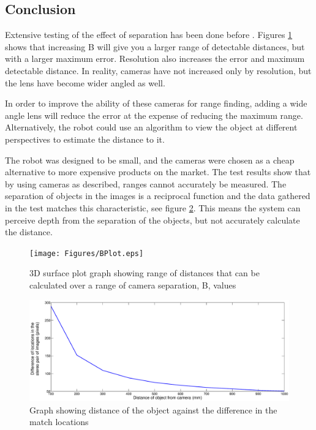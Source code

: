 \subsection{Conclusion}

Extensive testing of the effect of separation has been done before \citep{Mrovlje:Distance_Stereoscopic}. Figures \ref{fig:B:Plot} shows that increasing B will give you a larger range of detectable distances, but with a larger maximum error. Resolution also increases the error and maximum detectable distance. In reality, cameras have not increased only by resolution, but the lens have become wider angled as well. 

In order to improve the ability of these cameras for range finding, adding a wide angle lens will reduce the error at the expense of reducing the maximum range. Alternatively, the robot could use an algorithm to view the object at different perspectives to estimate the distance to it. 

The robot was designed to be small, and the cameras were chosen as a cheap alternative to more expensive products on the market. The test results show that by using cameras as described, ranges cannot accurately be measured. The separation of objects in the images is a reciprocal function and the data gathered in the test matches this characteristic, see figure \ref{fig:Distance:DeltaX}. This means the system can perceive depth from the separation of the objects, but not accurately calculate the distance.

\begin{figure}
\texttt{[image: Figures/BPlot.eps]}
\caption{3D surface plot graph showing range of distances that can be calculated over a range of camera separation, B, values}
\label{fig:B:Plot}
\end{figure}
\begin{figure}
\includegraphics[width=\textwidth]{Figures/Distance_DeltaX.eps}
\caption{Graph showing distance of the object against the difference in the match locations}
\label{fig:Distance:DeltaX}
\end{figure}
